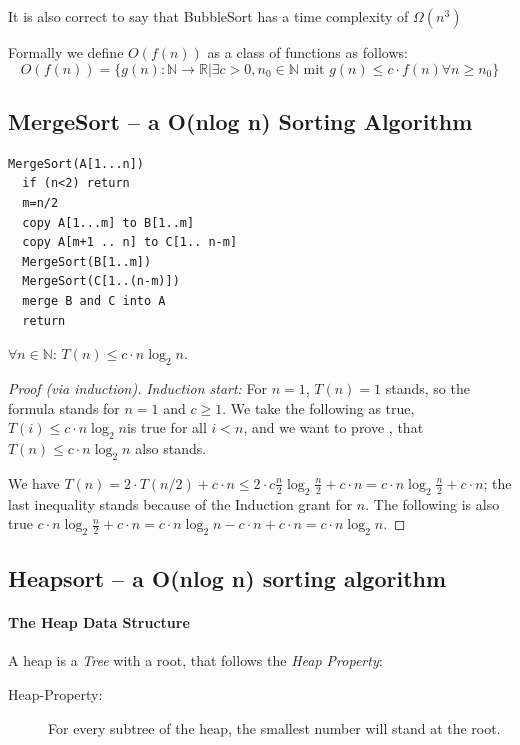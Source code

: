 It is also correct to say that BubbleSort has a time complexity of $\Omega(n^3)$

Formally we define $O(f(n))$ as a class of functions as follows:
\[
	O(f(n))=\{ g(n):\mathbb{N}\rightarrow \mathbb{R} | \exists c>0, n_0\in\mathbb{N} \mbox{ mit } g(n)\leq c\cdot f(n) \forall n\geq n_0\}
\]

\subsection{MergeSort -- a O(nlog n) Sorting Algorithm}

\begin{verbatim}
MergeSort(A[1...n])
  if (n<2) return
  m=n/2
  copy A[1...m] to B[1..m]
  copy A[m+1 .. n] to C[1.. n-m]
  MergeSort(B[1..m])
  MergeSort(C[1..(n-m)])
  merge B and C into A
  return
\end{verbatim}

\begin{lem}
 $\forall n\in \mathbb{N}$: $T(n)\leq c\cdot n\log_2 n$.
\end{lem} 
\begin{proof}[Proof (via induction)]
{\em Induction start:} For $n=1$, $T(n)=1$ stands, so the formula stands for $n=1$ and $c\geq 1$.
We take the following as true, $T(i)\leq c\cdot n\log_2 n$is true for all $i<n$, and we want to prove
, that $T(n)\leq c\cdot n\log_2 n$ also stands.

We have $T(n)=2\cdot T(n/2)+c\cdot n \leq 2\cdot c\frac{n}{2}\log_2 \frac{n}{2} + c\cdot n= c\cdot n\log_2 \frac{n}{2}+c\cdot n$; the last inequality stands
because of the Induction grant for $n$. The following is also true $c\cdot n\log_2\frac{n}{2}+c\cdot n= c\cdot n\log_2 n - c\cdot n + c\cdot n=c\cdot n\log_2 n$.
\end{proof}



\subsection{Heapsort -- a O(nlog n) sorting algorithm}

\paragraph{The Heap Data Structure}
A heap is a \emph{Tree} with a root, that follows the \emph{Heap Property}:
\begin{description}
\item[Heap-Property:] For every subtree of the heap, the smallest number will stand at the root.

\end{description}


